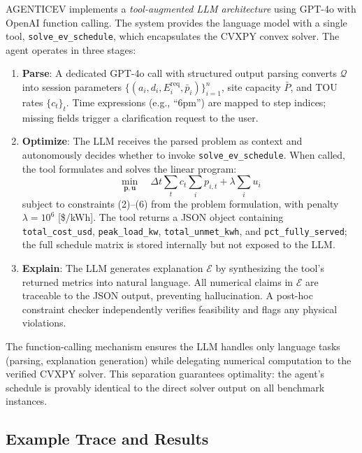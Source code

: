 \documentclass[11pt]{article}
\begin{document}
AGENTICEV implements a \textit{tool-augmented LLM architecture} using GPT-4o with OpenAI function calling. The system provides the language model with a single tool, \texttt{solve\_ev\_schedule}, which encapsulates the CVXPY convex solver. The agent operates in three stages:

\begin{enumerate}
    \item \textbf{Parse}: A dedicated GPT-4o call with structured output parsing converts $\mathcal{Q}$ into session parameters $\{(a_i, d_i, E_i^{\text{req}}, \bar{p}_i)\}_{i=1}^n$, site capacity $\bar{P}$, and TOU rates $\{c_t\}_t$. Time expressions (e.g., ``6pm'') are mapped to step indices; missing fields trigger a clarification request to the user.

    \item \textbf{Optimize}: The LLM receives the parsed problem as context and autonomously decides whether to invoke \texttt{solve\_ev\_schedule}. When called, the tool formulates and solves the linear program:
    \begin{equation}
    \min_{\mathbf{p}, \mathbf{u}} \quad \Delta t \sum_{t} c_t \sum_{i} p_{i,t} + \lambda \sum_{i} u_i
    \end{equation}
    subject to constraints (2)--(6) from the problem formulation, with penalty $\lambda = 10^6$ [\$/kWh]. The tool returns a JSON object containing \texttt{total\_cost\_usd}, \texttt{peak\_load\_kw}, \texttt{total\_unmet\_kwh}, and \texttt{pct\_fully\_served}; the full schedule matrix is stored internally but not exposed to the LLM.

    \item \textbf{Explain}: The LLM generates explanation $\mathcal{E}$ by synthesizing the tool's returned metrics into natural language. All numerical claims in $\mathcal{E}$ are traceable to the JSON output, preventing hallucination. A post-hoc constraint checker independently verifies feasibility and flags any physical violations.
\end{enumerate}

The function-calling mechanism ensures the LLM handles only language tasks (parsing, explanation generation) while delegating numerical computation to the verified CVXPY solver. This separation guarantees optimality: the agent's schedule is provably identical to the direct solver output on all benchmark instances.

\subsection*{Example Trace and Results}
\end{document}
